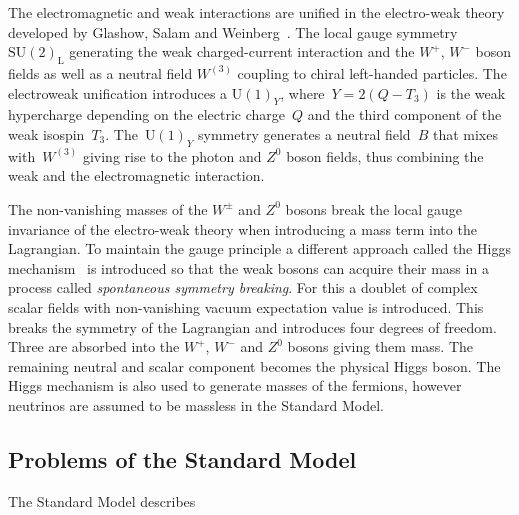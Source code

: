 The electromagnetic and weak interactions are unified in the electro-weak theory
developed by Glashow, Salam and Weinberg~\cite{glashow, salam, weinberg}. The
local gauge symmetry~$\mathrm{SU}(2)_\text{L}$ generating the weak
charged-current interaction and the $W^+$, $W^-$ boson fields as well as a
neutral field $W^{(3)}$ coupling to chiral left-handed particles. The
electroweak unification introduces a $\mathrm{U}(1)_Y$, where~$Y = 2 (Q - T_3)$
is the weak hypercharge depending on the electric charge~$Q$ and the third
component of the weak isospin~$T_3$. The~$\mathrm{U}(1)_Y$ symmetry generates a
neutral field~$B$ that mixes with~$W^{(3)}$ giving rise to the photon and $Z^0$
boson fields, thus combining the weak and the electromagnetic interaction.

The non-vanishing masses of the $W^\pm$ and $Z^0$ bosons break the local gauge
invariance of the electro-weak theory when introducing a mass term into the
Lagrangian. To maintain the gauge principle a different approach called the
Higgs mechanism~\cite{englert_brout, higgs} is introduced so that the weak
bosons can acquire their mass in a process called \emph{spontaneous symmetry
  breaking}. For this a doublet of complex scalar fields with non-vanishing
vacuum expectation value is introduced. This breaks the symmetry of the
Lagrangian and introduces four degrees of freedom. Three are absorbed into the
$W^+$, $W^-$ and $Z^0$ bosons giving them mass. The remaining neutral and scalar
component becomes the physical Higgs boson. The Higgs mechanism is also used to
generate masses of the fermions, however neutrinos are assumed to be massless in
the Standard Model.

\subsection{Problems of the Standard Model}

The Standard Model describes


